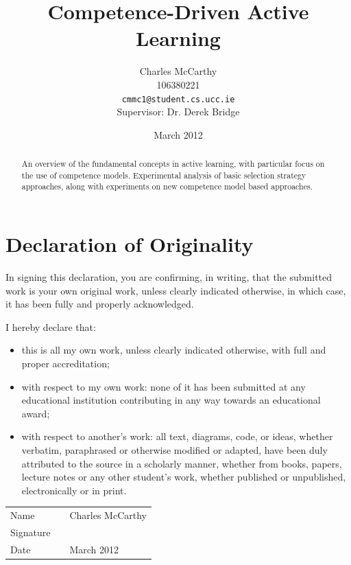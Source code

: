 \documentclass[a4paper,11pt]{report}
\title{Competence-Driven Active Learning}
\author{Charles McCarthy\\
  106380221\\
  \texttt{cmmc1@student.cs.ucc.ie}
  \\Supervisor: Dr. Derek Bridge}
\date{March 2012}
\begin{document}
\maketitle

\begin{abstract}
An overview of the fundamental concepts in active learning, with particular focus on the use of competence models. Experimental analysis of basic selection strategy approaches, along with experiments on new competence model based approaches.
\end{abstract}

\chapter*{Declaration of Originality}
\vspace*{\fill}
In signing this declaration, you are confirming, in writing, that the submitted work is your own original work, unless clearly indicated otherwise, in which case, it has been fully and properly acknowledged.

I hereby declare that:
\begin{itemize}
	\item this is all my own work, unless clearly indicated otherwise, with full and proper accreditation;
	\item with respect to my own work: none of it has been submitted at any educational institution contributing in any way towards an educational award;
	\item with respect to another's work: all text, diagrams, code, or ideas, whether verbatim, paraphrased or otherwise modified or adapted, have been duly attributed to the source in a scholarly manner, whether from books, papers, lecture notes or any other student's work, whether published or unpublished, electronically or in print. 
\end{itemize}

{
\renewcommand{\arraystretch}{4.5}
\begin{center}
 	\begin{tabular}{l @{:} p{0.4in} l}
		Name & & Charles McCarthy \\
		Signature & & \makebox[2.5in]{\hrulefill} \\
		Date & & March 2012 \\
	\end{tabular}
\end{center}
}
\vspace{\fill}
\end{document}
